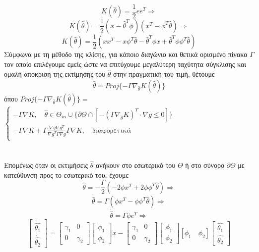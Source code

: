 \documentclass[12pt]{article}
\begin{document}
\[ K(\hat{\theta})=\frac{1}{2}ee^{T} \Rightarrow\]
\[ K(\hat{\theta})=\frac{1}{2}(x-\hat{\theta}^{T}\phi)(x^{T}-\phi^{T}\hat{\theta}) \Rightarrow\]
\[ K(\hat{\theta})=\frac{1}{2}(xx^{T}-x\phi^{T}\hat{\theta} - \hat{\theta}^{T}\phi x+\hat{\theta}^{T}\phi\phi^{T}\hat{\theta}) \]
Σύμφωνα με τη μέθοδο της κλίσης, για κάποιο διαγώνιο και θετικά ορισμένο πίνακα $\Gamma$ τον οποίο επιλέγουμε εμείς ώστε να επιτύχουμε μεγαλύτερη ταχύτητα σύγκλισης και ομαλή απόκριση της εκτίμησης του $\hat{\theta}$ στην πραγματική του τιμή, θέτουμε
\[ \dot{\hat{\theta}}=Proj \{ -\Gamma \nabla_{\hat{\theta}} K(\hat{\theta}) \} \]
όπου $Proj \{ -\Gamma \nabla_{\hat{\theta}} K(\hat{\theta}) \}=$
$ \left\{
    \begin{array}{l}
        -\Gamma \nabla K , \quad \hat{\theta} \in \Theta_{in}\cup \{ \partial\Theta \cap [ -(\Gamma \nabla_{\hat{\theta}} K)^{T} \cdot \nabla g \leq 0 ] \} \\
        -\Gamma \nabla K + \Gamma \frac{\nabla g \nabla    g^{T}}{\nabla g^{T} \Gamma \nabla g}\Gamma \nabla K, \quad \text{διαφορετικά} \\   
    \end{array}
    \right.$
\\ \\ \\
Επομένως όταν οι εκτιμήσεις $\hat{\theta}$ ανήκουν στο εσωτερικό του $\Theta$ ή στο σύνορο $\partial \Theta$ με κατεύθυνση προς το εσωτερικό του, έχουμε
\[\dot{\hat{\theta}}=-\frac{\Gamma}{2}(-2\phi x^{T} +2\phi\phi^{T}\hat{\theta})\Rightarrow\] 
\[\dot{\hat{\theta}}= \Gamma(\phi x^{T} -\phi\phi^{T}\hat{\theta})  \Rightarrow \]
\[\dot{\hat{\theta}} =\Gamma \phi e^{T} \Rightarrow\]
\[ 
\begin{bmatrix}
 \dot{\hat{\theta_1}} \\
  \dot{\hat{\theta_2}} 
\end{bmatrix}= 
\begin{bmatrix}
    \gamma_1 & 0 \\
    0 & \gamma_2
\end{bmatrix}
 \begin{bmatrix}
  \phi_{1} \\
   \phi_{2} \end{bmatrix}
 x -
 \begin{bmatrix}
    \gamma_1 & 0 \\
    0 & \gamma_2
\end{bmatrix}
 \begin{bmatrix}
  \phi_{1} \\
   \phi_{2} 
\end{bmatrix} 
 \left[ \phi_{1} \quad \phi_{2} \right]
 \begin{bmatrix}
  \hat{\theta_1} \\
 \hat{\theta_2} 
 \end{bmatrix}  \]
\end{document}
